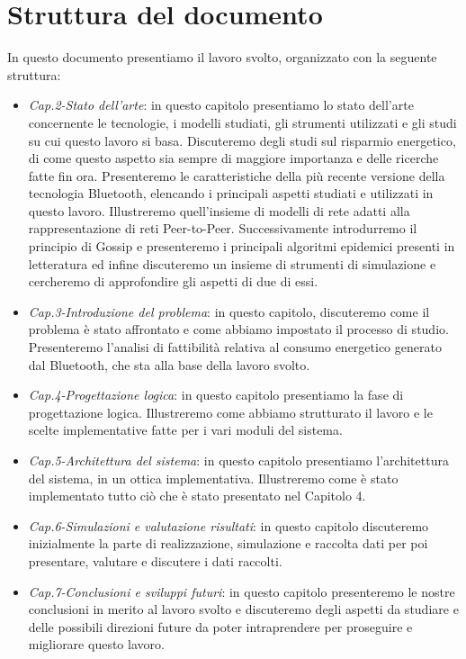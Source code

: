 \section{Struttura del documento}
In questo documento presentiamo il lavoro svolto, organizzato con la seguente struttura:
\begin{itemize}
	\item \textit{Cap.2-Stato dell'arte}: in questo capitolo presentiamo lo stato dell'arte concernente le tecnologie, i modelli studiati, gli strumenti utilizzati e gli studi su cui questo lavoro si basa. Discuteremo degli studi sul risparmio energetico, di come questo aspetto sia sempre di maggiore importanza e delle ricerche fatte fin ora. Presenteremo le caratteristiche della più recente versione della tecnologia Bluetooth, elencando i principali aspetti studiati e utilizzati in questo lavoro. Illustreremo quell'insieme di modelli di rete adatti alla rappresentazione di reti Peer-to-Peer. Successivamente introdurremo il principio di Gossip e presenteremo i principali algoritmi epidemici presenti in letteratura ed infine discuteremo un insieme di strumenti di simulazione e cercheremo di approfondire gli aspetti di due di essi.
	\item \textit{Cap.3-Introduzione del problema}: in questo capitolo, discuteremo come il problema è stato affrontato e come abbiamo impostato il processo di studio. Presenteremo l'analisi di fattibilità relativa al consumo energetico generato dal Bluetooth, che sta alla base della lavoro svolto.
	\item \textit{Cap.4-Progettazione logica}: in questo capitolo presentiamo la fase di progettazione logica. Illustreremo come abbiamo strutturato il lavoro e le scelte implementative fatte per i vari moduli del sistema.
	\item \textit{Cap.5-Architettura del sistema}: in questo capitolo presentiamo l'architettura del sistema, in un ottica implementativa. Illustreremo come è stato implementato tutto ciò che è stato presentato nel Capitolo 4.
	\item \textit{Cap.6-Simulazioni e valutazione risultati}: in questo capitolo discuteremo inizialmente la parte di realizzazione, simulazione e raccolta dati per poi presentare, valutare e discutere i dati raccolti.
	\item \textit{Cap.7-Conclusioni e sviluppi futuri}: in questo capitolo presenteremo le nostre conclusioni in merito al lavoro svolto e discuteremo degli aspetti da studiare e delle possibili direzioni future da poter intraprendere per proseguire e migliorare questo lavoro.
\end{itemize}